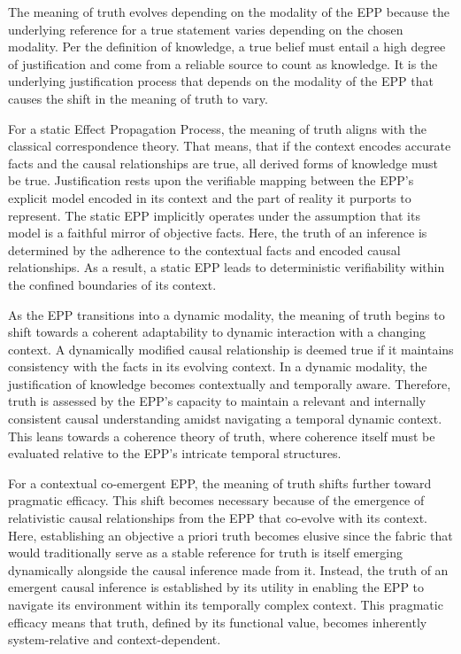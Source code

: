 \documentclass{article}
\begin{document}
The meaning of truth evolves depending on the modality of the EPP because the underlying reference for a true statement varies depending on the chosen modality. Per the definition of knowledge, a true belief must entail a high degree of justification and come from a reliable source to count as knowledge. It is the underlying justification process that depends on the modality of the EPP that causes the shift in the meaning of truth to vary.

For a static Effect Propagation Process, the meaning of truth aligns with the classical correspondence theory. That means, that if the context encodes accurate facts and the causal relationships are true, all derived forms of knowledge must be true.
Justification rests upon the verifiable mapping between the EPP's explicit model encoded in its context and the part of reality it purports to represent. The static EPP implicitly operates under the assumption that its model is a faithful mirror of objective facts. Here, the truth of an inference is determined by the adherence to the contextual facts and encoded causal relationships. As a result, a static EPP leads to deterministic verifiability within the confined boundaries of its context.

As the EPP transitions into a dynamic modality, the meaning of truth begins to shift towards a coherent adaptability to dynamic interaction with a changing context. A dynamically modified causal relationship is deemed true if it maintains consistency with the facts in its evolving context. In a dynamic modality,  the justification of knowledge becomes contextually and temporally aware. Therefore, truth is assessed by the EPP's capacity to maintain a relevant and internally consistent causal understanding amidst navigating a temporal dynamic context.  This leans towards a coherence theory of truth, where coherence itself must be evaluated relative to the EPP’s intricate temporal structures.

For a contextual co-emergent EPP, the meaning of truth shifts further toward pragmatic efficacy. This shift becomes necessary because of the emergence of relativistic causal relationships from the EPP that co-evolve with its context. Here, establishing an objective a priori truth becomes elusive since the fabric that would traditionally serve as a stable reference for truth is itself emerging dynamically alongside the causal inference made from it. Instead, the truth of an emergent causal inference is established by its utility in enabling the EPP to navigate its environment within its temporally complex context.
This pragmatic efficacy means that truth, defined by its functional value, becomes inherently system-relative and context-dependent.
\end{document}
